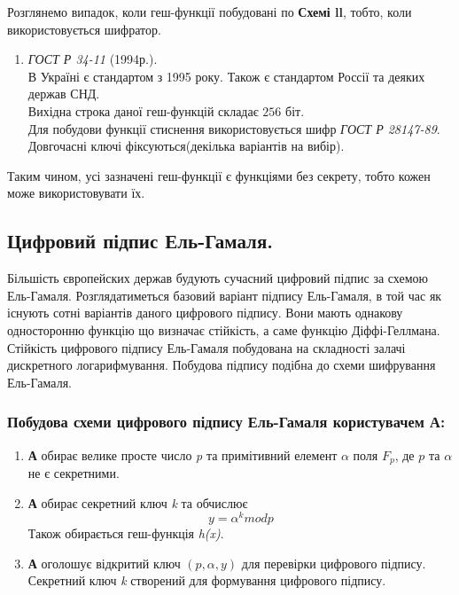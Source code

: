 Розглянемо випадок, коли геш-функції побудовані по \textbf{Схемі ll}, тобто, коли використовується шифратор.
\begin{enumerate}
\item \textit{ГОСТ Р 34-11} (1994р.).\\
В Україні є стандартом з 1995 року. Також є стандартом Россії та деяких держав СНД.\\
Вихідна строка даної геш-функцій складає $256$ біт.\\
Для побудови функції стиснення використовується шифр \textit{ГОСТ Р 28147-89}.\\
Довгочасні ключі фіксуються(декілька варіантів на вибір).
\end{enumerate}
Таким чином, усі зазначені геш-функції є функціями без секрету, тобто кожен може використовувати їх.
\subsection*{Цифровий підпис Ель-Гамаля.}
Більшість європейских держав будують сучасний цифровий підпис за схемою Ель-Гамаля. Розглядатиметься базовий варіант підпису Ель-Гамаля, в той час як існують сотні варіантів даного цифрового підпису. Вони мають однакову односторонню функцію що визначає стійкість, а саме функцію Діффі-Геллмана. Стійкість цифрового підпису Ель-Гамаля побудована на складності залачі дискретного логарифмування. Побудова підпису подібна до схеми шифрування Ель-Гамаля.\\
\subsubsection*{Побудова схеми цифрового підпису Ель-Гамаля користувачем \textbf{А}:}
\begin{enumerate}
\item \textbf{А} обирає велике просте число \textit{p} та примітивний елемент $\alpha$ поля \textit{$F_p$}, де \textit{$p$} та $\alpha$ не є секретними.
\item \textbf{А} обирає секретний ключ \textit{k} та обчислює $$y=\alpha^{k}modp$$ Також обирається геш-функція \textit{h(x)}.
\item \textbf{А} оголошує відкритий ключ \textit{$(p,\alpha,y)$} для перевірки цифрового підпису. Секретний ключ \textit{k} створений для формування цифрового підпису.
\end{enumerate}
